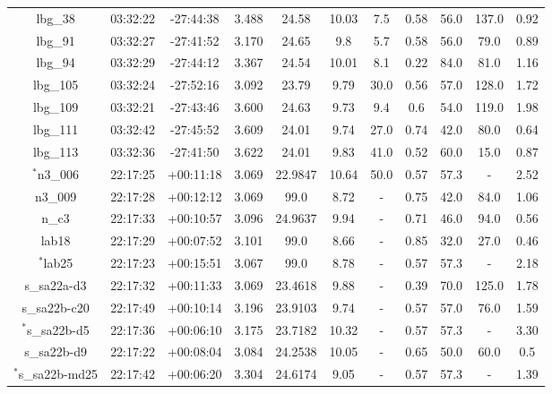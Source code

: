 \documentclass[fleqn,usenatbib]{mn2e}
\begin{document}
\begin{table*}
\begin{threeparttable}
\begin{tabular}{ccccccccccc}
lbg\_38         & 03:32:22 & -27:44:38 & 3.488       & 24.58  & 10.03 & 7.5  & 0.58        & 56.0        & 137.0   & 0.92      \\
lbg\_91         & 03:32:27 & -27:41:52 & 3.170       & 24.65  & 9.8   & 5.7  & 0.58        & 56.0        & 79.0    & 0.89 \\
lbg\_94         & 03:32:29 & -27:44:12 & 3.367       & 24.54  & 10.01 & 8.1  & 0.22        & 84.0        & 81.0    & 1.16      \\
lbg\_105        & 03:32:24 & -27:52:16 & 3.092      & 23.79  & 9.79  & 30.0 & 0.56        & 57.0        & 128.0   & 1.72      \\
lbg\_109        & 03:32:21 & -27:43:46 & 3.600       & 24.63  & 9.73  & 9.4  & 0.6         & 54.0        & 119.0   & 1.98      \\
lbg\_111        & 03:32:42 & -27:45:52 & 3.609       & 24.01  & 9.74  & 27.0 & 0.74        & 42.0        & 80.0    & 0.64      \\
lbg\_113        & 03:32:36 & -27:41:50 & 3.622      & 24.01  & 9.83  & 41.0 & 0.52        & 60.0        & 15.0    & 0.87      \\
$^{*}$n3\_006       & 22:17:25 & +00:11:18 & 3.069     & 22.9847 & 10.64 & 50.0 & 0.57         & 57.3        & -    & 2.52      \\
n3\_009       & 22:17:28 & +00:12:12 & 3.069 & 99.0    & 8.72  & -            & 0.75        & 42.0        & 84.0    & 1.06      \\
n\_c3         & 22:17:33 & +00:10:57 & 3.096       & 24.9637 & 9.94  & -            & 0.71        & 46.0        & 94.0    & 0.56      \\
lab18         & 22:17:29 & +00:07:52 & 3.101           & 99.0    & 8.66  & -            & 0.85        & 32.0        & 27.0    & 0.46      \\
$^{*}$lab25         & 22:17:23 & +00:15:51 & 3.067      & 99.0    & 8.78  & -            & 0.57         & 57.3        & -    & 2.18      \\
s\_sa22a-d3   & 22:17:32 & +00:11:33 & 3.069 & 23.4618 & 9.88  & -            & 0.39        & 70.0        & 125.0   & 1.78      \\
s\_sa22b-c20  & 22:17:49 & +00:10:14 & 3.196     & 23.9103 & 9.74  & -            & 0.57        & 57.0        & 76.0    & 1.59      \\
$^{*}$s\_sa22b-d5  & 22:17:36 & +00:06:10 & 3.175 & 23.7182 & 10.32 & -            & 0.57         & 57.3        & -    & 3.30      \\
s\_sa22b-d9   & 22:17:22 & +00:08:04 & 3.084    & 24.2538 & 10.05 & -            & 0.65        & 50.0        & 60.0    & 0.5       \\
$^{*}$s\_sa22b-md25 & 22:17:42 & +00:06:20 & 3.304     & 24.6174 & 9.05  & -            & 0.57         & 57.3        & -    & 1.39      


\end{tabular}
\end{threeparttable}
\end{table*}
\end{document}
